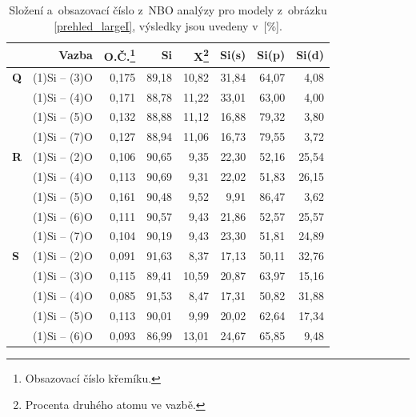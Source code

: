 \documentclass[
digital, %
table,   %
nolof,     %
nolot,     %
oneside,
]{fithesis3}
\begin{document}
\begin{table}[H]
\caption{Složení a~obsazovací číslo z~NBO analýzy pro modely z~obrázku \ref{prehled_largeI}, výsledky jsou uvedeny v~[\%].}
\begin{minipage}{\textwidth}
\begin{center}
\begin{tabular}{|l|r|r|r|r|r|r|r|}
\hline
\label{nbo_largeI}&  Vazba & O.Č.\footnote{Obsazovací číslo křemíku.} & Si & X\footnote{Procenta druhého atomu ve  vazbě.} & Si(s) & Si(p) &Si(d) \\ \hline
\textbf{Q}&  (1)Si -- (3)O   & 0,175 & 89,18   & 10,82   & 31,84   & 64,07   & 4,08   \\ \hline
&  (1)Si -- (4)O  & 0,171 & 88,78   & 11,22   & 33,01   & 63,00   & 4,00   \\ \hline
& (1)Si -- (5)O & 0,132 & 88,88   & 11,12   & 16,88   & 79,32   & 3,80   \\ \hline
& (1)Si -- (7)O & 0,127 & 88,94   & 11,06   & 16,73   & 79,55   & 3,72   \\ \hline
\textbf{R} & (1)Si -- (2)O  & 0,106 & 90,65   & 9,35   & 22,30   & 52,16   & 25,54   \\ \hline
& (1)Si -- (4)O & 0,113 & 90,69   & 9,31   & 22,02   & 51,83   & 26,15   \\ \hline
&  (1)Si -- (5)O  & 0,161 & 90,48   & 9,52   & 9,91   & 86,47   & 3,62   \\ \hline
&  (1)Si -- (6)O & 0,111 & 90,57   & 9,43   & 21,86   & 52,57   & 25,57   \\ \hline
& (1)Si -- (7)O & 0,104 & 90,19   & 9,43   & 23,30   & 51,81   & 24,89   \\ \hline
\textbf{S}&(1)Si -- (2)O  & 0,091 & 91,63   & 8,37   & 17,13   & 50,11   & 32,76   \\ \hline
& (1)Si -- (3)O  & 0,115 & 89,41   & 10,59   & 20,87   & 63,97   & 15,16   \\ \hline
&   (1)Si -- (4)O   & 0,085 & 91,53   & 8,47   & 17,31   & 50,82   & 31,88   \\ \hline
&  (1)Si -- (5)O  & 0,113 & 90,01   & 9,99   & 20,02   & 62,64   & 17,34   \\ \hline
& (1)Si -- (6)O & 0,093 & 86,99   & 13,01   & 24,67   & 65,85   & 9,48   \\ \hline
\end{tabular}\end{center}\end{minipage}\end{table}
\end{document}
